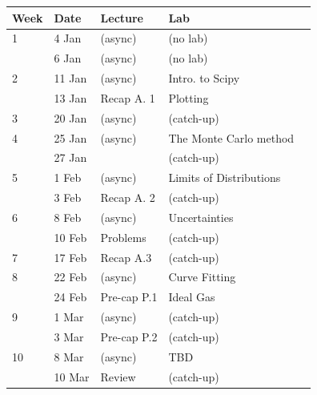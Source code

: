 \documentclass[12pt]{article}
\begin{document}
\begin{table}[h!]
\normalsize %
\begin{tabular}{ lllll }
\hline
\textbf{Week} & \textbf{Date} & \textbf{Lecture} & \textbf{Lab} \\
\hline
1 & 4 Jan & (async)       & (no lab) \\
  & 6 Jan & (async)       & (no lab)\\
\hline
2 & 11 Jan & (async)      & Intro. to Scipy \\
  & 13 Jan & Recap A. 1   & Plotting \\
\hline
3 & 20 Jan & (async)      & (catch-up) \\
\hline
4 & 25 Jan & (async)      & The Monte Carlo method\\
  & 27 Jan &              & (catch-up)\\
\hline
5 & 1 Feb  & (async)      & Limits of Distributions\\
  & 3 Feb  & Recap A. 2   & (catch-up)\\
\hline
6 & 8 Feb  & (async)      & Uncertainties\\
  & 10 Feb & Problems     & (catch-up)\\
\hline
7 & 17 Feb  & Recap A.3   & (catch-up)\\
\hline
8 & 22 Feb  & (async)     & Curve Fitting \\
  & 24 Feb  & Pre-cap P.1 & Ideal Gas\\
\hline
9 & 1 Mar   & (async)     & (catch-up) \\
  & 3 Mar   & Pre-cap P.2 & (catch-up) \\
\hline
10 & 8 Mar  & (async)     & TBD \\
   & 10 Mar & Review      & (catch-up) \\
\hline
\end{tabular} 
\end{table}
\end{document}
